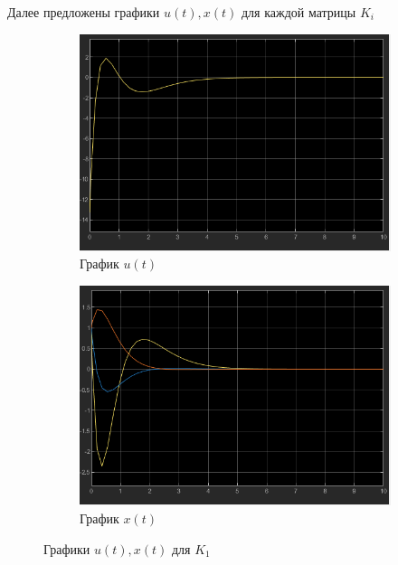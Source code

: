 \documentclass[a4paper, 12pt]{article}
\begin{document}
    Далее предложены графики $u(t),x(t)$ для каждой матрицы $K_i$
    \begin{figure}[H]
        \centering
        \begin{subfigure}{0.45\textwidth}
            \centering
            \includegraphics[width=\linewidth]{u_t_k1_task1.png}
            \caption{График $u(t)$}
            \label{fig:task_1_u_t_k1}
        \end{subfigure}
        \hfill
        \begin{subfigure}{0.45\textwidth}
            \centering
            \includegraphics[width=\linewidth]{x_t_k1_task1.png}
            \caption{График $x(t)$}
            \label{fig:task_1_x_t_k1}
        \end{subfigure}
        \caption{Графики $u(t),x(t)$ для $K_1$}
        \label{fig:task_1_modeling_1}
    \end{figure}
\end{document}

